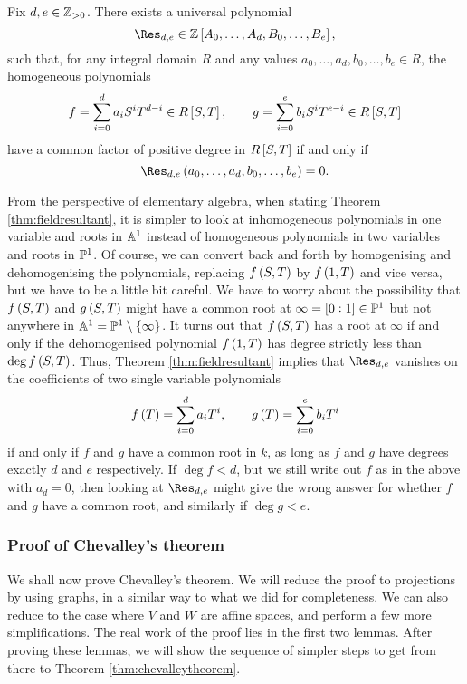 \begin{theorem}
\label{thm:domainresultant}
Fix $ d, e \in \ZZ_{> 0} $. There exists a universal polynomial
$$ \Res_{d, e} \in \ZZ\sbr{A_0, \dots, A_d, B_0, \dots, B_e}, $$
such that, for any integral domain $ R $ and any values $ a_0, \dots, a_d, b_0, \dots, b_e \in R $, the homogeneous polynomials
$$ f = \sum_{i = 0}^d a_iS^iT^{d - i} \in R\sbr{S, T}, \qquad g = \sum_{i = 0}^e b_iS^iT^{e - i} \in R\sbr{S, T} $$
have a common factor of positive degree in $ R\sbr{S, T} $ if and only if
$$ \Res_{d, e}\br{a_0, \dots, a_d, b_0, \dots, b_e} = 0. $$
\end{theorem}

From the perspective of elementary algebra, when stating Theorem \ref{thm:fieldresultant}, it is simpler to look at inhomogeneous polynomials in one variable and roots in $ \AA^1 $ instead of homogeneous polynomials in two variables and roots in $ \PP^1 $. Of course, we can convert back and forth by homogenising and dehomogenising the polynomials, replacing $ f\br{S, T} $ by $ f\br{1, T} $ and vice versa, but we have to be a little bit careful. We have to worry about the possibility that $ f\br{S, T} $ and $ g\br{S, T} $ might have a common root at $ \infty = \sbr{0 : 1} \in \PP^1 $ but not anywhere in $ \AA^1 = \PP^1 \setminus \cbr{\infty} $. It turns out that $ f\br{S, T} $ has a root at $ \infty $ if and only if the dehomogenised polynomial $ f\br{1, T} $ has degree strictly less than $ \deg f\br{S, T} $. Thus, Theorem \ref{thm:fieldresultant} implies that $ \Res_{d, e} $ vanishes on the coefficients of two single variable polynomials
$$ f\br{T} = \sum_{i = 0}^d a_iT^i, \qquad g\br{T} = \sum_{i = 0}^e b_iT^i $$
if and only if $ f $ and $ g $ have a common root in $ k $, as long as $ f $ and $ g $ have degrees exactly $ d $ and $ e $ respectively. If $ \deg f < d $, but we still write out $ f $ as in the above with $ a_d = 0 $, then looking at $ \Res_{d, e} $ might give the wrong answer for whether $ f $ and $ g $ have a common root, and similarly if $ \deg g < e $.

\subsubsection{Proof of Chevalley's theorem}


We shall now prove Chevalley's theorem. We will reduce the proof to projections by using graphs, in a similar way to what we did for completeness. We can also reduce to the case where $ V $ and $ W $ are affine spaces, and perform a few more simplifications. The real work of the proof lies in the first two lemmas. After proving these lemmas, we will show the sequence of simpler steps to get from there to Theorem \ref{thm:chevalleytheorem}.

